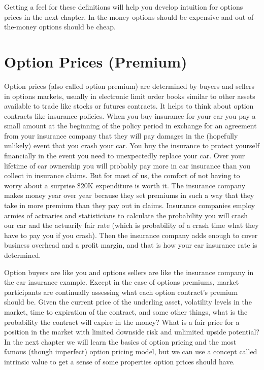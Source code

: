 \documentclass[
  letterpaper,
  DIV=11,
  numbers=noendperiod]{scrreprt}
\begin{document}
Getting a feel for these definitions will help you develop intuition for
options prices in the next chapter. In-the-money options should be
expensive and out-of-the-money options should be cheap.

\section{Option Prices (Premium)}\label{option-prices-premium}

Option prices (also called option premium) are determined by buyers and
sellers in options markets, usually in electronic limit order books
similar to other assets available to trade like stocks or futures
contracts. It helps to think about option contracts like insurance
policies. When you buy insurance for your car you pay a small amount at
the beginning of the policy period in exchange for an agreement from
your insurance company that they will pay damages in the (hopefully
unlikely) event that you crash your car. You buy the insurance to
protect yourself financially in the event you need to unexpectedly
replace your car. Over your lifetime of car ownership you will probably
pay more in car insurance than you collect in insurance claims. But for
most of us, the comfort of not having to worry about a surprise \$20K
expenditure is worth it. The insurance company makes money year over
year because they set premiums in such a way that they take in more
premium than they pay out in claims. Insurance companies employ armies
of actuaries and statisticians to calculate the probability you will
crash our car and the actuarily fair rate (which is probability of a
crash time what they have to pay you if you crash). Then the insurance
company adds enough to cover business overhead and a profit margin, and
that is how your car insurance rate is determined.

Option buyers are like you and options sellers are like the insurance
company in the car insurance example. Except in the case of options
premiums, market participants are continually assessing what each option
contract's premium should be. Given the current price of the underling
asset, volatility levels in the market, time to expiration of the
contract, and some other things, what is the probability the contract
will expire in the money? What is a fair price for a position in the
market with limited downside risk and unlimited upside potential? In the
next chapter we will learn the basics of option pricing and the most
famous (though imperfect) option pricing model, but we can use a concept
called intrinsic value to get a sense of some properties option prices
should have.
\end{document}
